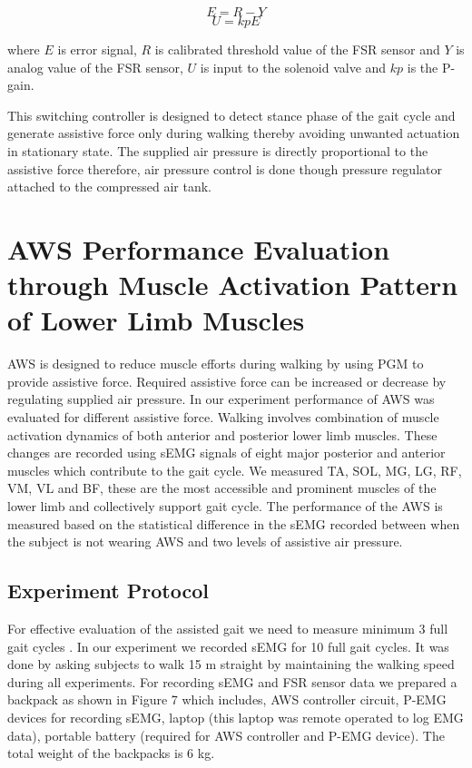 \documentclass[letterpaper, 10 pt, conference]{ieeeconf}  %
\begin{document}
\begin{equation}\label{kevalue}
E = R - Y 
\end{equation}
\begin{equation}\label{uvalue}
U = kpE
\end{equation}

where $E$ is error signal, $R$ is calibrated threshold value of the FSR sensor and $Y$ is analog value of the FSR sensor, $U$ is input to the solenoid valve and $kp$ is the P-gain. 

This switching controller is designed to detect stance phase of the gait cycle and generate assistive force only during walking thereby avoiding unwanted actuation in stationary state. The supplied air pressure is directly proportional to the assistive force therefore, air pressure control is done though pressure regulator attached to the compressed air tank.


\section{AWS Performance Evaluation through Muscle Activation Pattern of Lower Limb Muscles} \label{Evaluation}
AWS is designed to reduce muscle efforts during walking by using PGM to provide assistive force. Required assistive force can be increased or decrease by regulating supplied air pressure. In our experiment performance of AWS was evaluated for different assistive force. Walking involves combination of muscle activation dynamics of both anterior and posterior lower limb muscles. These changes are recorded using sEMG signals of eight major posterior and anterior muscles which contribute to the gait cycle. We measured TA, SOL, MG, LG, RF, VM, VL and BF, these are the most accessible and prominent muscles of the lower limb and collectively support gait cycle. The performance of the AWS is measured based on the statistical difference in the sEMG recorded between when the subject is not wearing AWS and two levels of assistive air pressure.

\subsection{Experiment Protocol}
For effective evaluation of the assisted gait we need to measure minimum 3 full gait cycles \cite{10}. In our experiment we recorded sEMG for 10 full gait cycles. It was done by asking subjects to walk 15 m straight by maintaining the walking speed during all experiments. For recording sEMG and FSR sensor data we prepared a backpack as shown in Figure 7 which includes, AWS controller circuit, P-EMG devices for recording sEMG, laptop (this laptop was remote operated to log EMG data), portable battery (required for AWS controller and P-EMG device). The total weight of the backpacks is 6 kg.
\end{document}
